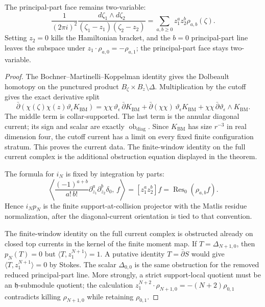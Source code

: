 \begin{thm}
  The principal-part face remains two-variable:
  \[
    \frac{1}{(2\pi i)^2}
    \frac{d\zeta_1\wedge d\zeta_2}
         {(\zeta_1-z_1)(\zeta_2-z_2)}
    =
    \sum_{a,b\geq0}z_1^az_2^b\rho_{a,b}(\zeta).
  \]
  Setting \(z_2=0\) kills the Hamiltonian bracket, and the \(b=0\)
  principal-part line leaves the subspace under
  \(z_1\cdot\rho_{a,0}=-\rho_{a,1}\); the principal-part face stays
  two-variable.
\end{thm}

\begin{proof}
  The Bochner--Martinelli--Koppelman identity gives the Dolbeault
  homotopy on the punctured product \(B_\zeta\times B_z\setminus\Delta\).
  Multiplication by the cutoff gives the exact derivative split
  \[
    \bar\partial(\chi(\zeta)\chi(z)
      \vartheta_\epsilon K_{\mathrm{BM}})
    =
    \chi\chi\,\vartheta_\epsilon\,\bar\partial K_{\mathrm{BM}}
    +\bar\partial(\chi\chi)\,\vartheta_\epsilon K_{\mathrm{BM}}
    +\chi\chi\,\bar\partial\vartheta_\epsilon\wedge K_{\mathrm{BM}} .
  \]
  The middle term is collar-supported.  The last term is the annular
  diagonal current; its sign and scalar are exactly
  \(\operatorname{ob}_{\mathrm{diag}}\).  Since \(K_{\mathrm{BM}}\) has
  size \(r^{-3}\) in real dimension four, the cutoff current has a limit
  on every fixed finite configuration stratum.  This proves the current
  data.  The finite-window identity on the full current complex is the
  additional obstruction equation displayed in the theorem.

  The formula for \(i_N\) is fixed by integration by parts:
  \[
    \left\langle
      \frac{(-1)^{a+b}}{a!\,b!}
      \partial_{z_1}^a\partial_{z_2}^b\delta_0,\,
      f
    \right\rangle
    =
    [z_1^az_2^b]f
    =
    \operatorname{Res}_0(\rho_{a,b}f).
  \]
  Hence \(i_Np_N\) is the finite support-at-collision projector with the
  Matlis residue normalization, after the diagonal-current orientation is
  tied to that convention.

  The finite-window identity on the full current complex is obstructed
  already on closed top currents in the kernel of the finite moment
  map.  If
  \(T=\Delta_{N+1,0}\), then \(p_N(T)=0\) but
  \(\langle T,z_1^{N+1}\rangle=1\).  A putative identity
  \(T=\bar\partial S\) would give
  \(\langle T,z_1^{N+1}\rangle=0\) by Stokes.  The scalar
  \(\Delta_{0,0}\) is the same obstruction for the removed reduced
  principal-part line.  More strongly, a strict support-local quotient
  must be an \(\mathfrak h\)-submodule quotient; the calculation
  \(z_1^{N+2}\cdot\rho_{N+1,0}=-(N+2)\rho_{0,1}\) contradicts killing
  \(\rho_{N+1,0}\) while retaining \(\rho_{0,1}\).


\end{proof}
